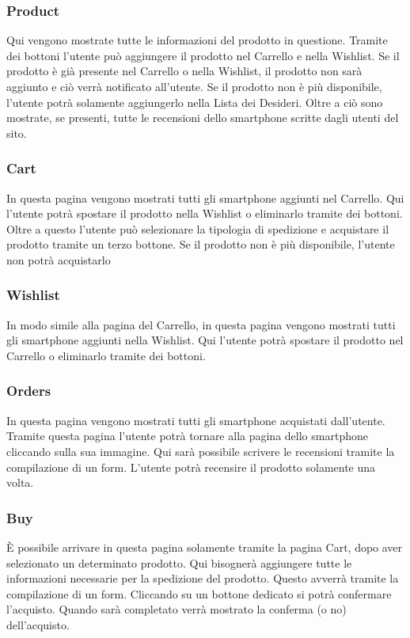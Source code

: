 \documentclass[14pt]{extarticle}
\begin{document}
\subsubsection{Product}
Qui vengono mostrate tutte le informazioni del prodotto in questione.
Tramite dei bottoni l'utente può aggiungere il prodotto nel Carrello e nella Wishlist. Se il prodotto è
già presente nel Carrello o nella Wishlist, il prodotto non sarà aggiunto e ciò verrà notificato
all'utente. Se il prodotto non è più disponibile, l'utente potrà solamente aggiungerlo nella Lista dei
Desideri. Oltre a ciò sono mostrate, se presenti, tutte le recensioni dello smartphone scritte dagli
utenti del sito. 

\subsubsection{Cart}
In questa pagina vengono mostrati tutti gli smartphone aggiunti nel Carrello. Qui l'utente potrà
spostare il prodotto nella Wishlist o eliminarlo tramite dei bottoni. Oltre a questo l'utente può
selezionare la tipologia di spedizione e acquistare il prodotto tramite un terzo bottone. Se il
prodotto non è più disponibile, l'utente non potrà acquistarlo

\subsubsection{Wishlist}
In modo simile alla pagina del Carrello, in questa pagina vengono mostrati tutti gli smartphone
aggiunti nella Wishlist. Qui l'utente potrà spostare il prodotto nel Carrello o eliminarlo tramite dei
bottoni.

\subsubsection{Orders}
In questa pagina vengono mostrati tutti gli smartphone acquistati dall'utente. Tramite questa
pagina l'utente potrà tornare alla pagina dello smartphone cliccando sulla sua immagine. Qui sarà
possibile scrivere le recensioni tramite la compilazione di un form. L'utente potrà recensire il
prodotto solamente una volta.

\subsubsection{Buy}
È possibile arrivare in questa pagina solamente tramite la pagina Cart, dopo aver selezionato un
determinato prodotto. Qui bisognerà aggiungere tutte le informazioni necessarie per la spedizione
del prodotto. Questo avverrà tramite la compilazione di un form. Cliccando su un bottone
dedicato si potrà confermare l'acquisto. Quando sarà completato verrà mostrato la conferma (o
no) dell'acquisto.
\end{document}
